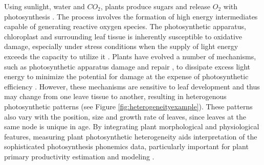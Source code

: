 Using sunlight, water and $CO_2$, plants produce sugars and release $O_2$ with photosynthesis \cite{kramer2011importance}. The process involves the formation of high energy intermediates capable of generating reactive oxygen species. The photosynthetic apparatus, chloroplast and surrounding leaf tissue is inherently susceptible to oxidative damage, especially under stress conditions when the supply of light energy exceeds the capacity to utilize it \cite{asada1996radical,durrant1990characterisation}. Plants have evolved a number of mechanisms, such as photosynthetic apparatus damage and repair \cite{melis1999photosystem}, to dissipate excess light energy to minimize the potential for damage at the expense of photosynthetic efficiency \cite{adams2006energy,rochaix2014regulation}. However, these mechanisms are sensitive to leaf development and thus may change from one leave tissue to another, resulting in heterogenous photosynthetic patterns (see Figure \ref{fig:heterogeneityexample}). These patterns also vary with the position, size and growth rate of leaves, since leaves at the same node is unique in age. By integrating plant morphological and physiological features, measuring plant photosynthetic heterogeneity aids interpretation of the sophisticated photosynthesis phonemics data, particularly important for plant primary productivity estimation and modeling \cite{meng2007spatial}.




